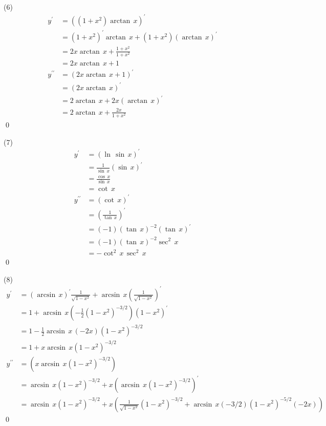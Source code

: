 (6) \solve
\begin{align}
    y^{\prime} &= \left(\left(1+x^2\right)\arctan \, x\right)^{\prime}\\
    &= \left(1+x^2\right)^\prime \arctan \, x + \left(1+x^2\right) \left(\arctan \, x\right)^\prime \\
    &= 2x \arctan \, x + \frac{1+x^2}{1+x^2} \\
    &= 2x \arctan \, x + 1 \\
    y^{\prime\prime} &= \left(2x\arctan \, x + 1\right)^\prime \\
    &= \left(2x\arctan \, x\right)^\prime \\
    &= 2 \arctan \, x + 2x \left(\arctan \, x\right)^{\prime} \\
    &= 2\arctan \, x + \frac{2x}{1+x^2}
\end{align}
\qed\bigskip

(7) \solve
\begin{align}
    y^{\prime} &= \left(\ln \, \sin \, x\right)^\prime \\
    &= \frac{1}{\sin \, x} \left(\sin \, x\right)^\prime \\
    &= \frac{\cos \, x}{\sin \, x} \\
    &= \cot \, x \\
    y^{\prime\prime} &= \left(\cot \, x\right)^\prime \\
    &= \left(\frac{1}{\tan \, x}\right)^\prime \\
    &= \left(-1\right)\left(\tan \, x\right)^{-2} \left(\tan \, x\right)^\prime \\
    &= \left(-1\right)\left(\tan \, x\right)^{-2}\sec^2 \, x \\
    &= - \cot^2 \, x \, \sec^2 \, x
\end{align}
\qed\bigskip

(8) \solve
\begin{align}
    y^\prime &= \left(\arcsin \, x\right)^\prime \frac{1}{\sqrt{1-x^2}} + \arcsin \, x \left(\frac{1}{\sqrt{1-x^2}}\right)^\prime \\
    &= 1 + \arcsin \, x \left(-\frac{1}{2}\left(1-x^2\right)^{-3/2}\right)\left(1-x^2\right)^\prime \\
    &= 1 -\frac{1}{2}\arcsin \, x \, \left(-2x\right) \left(1-x^2\right)^{-3/2} \\
    &= 1+x\arcsin \, x \left(1-x^2\right)^{-3/2} \\
    y^{\prime\prime} &= \left(x\arcsin \, x \left(1-x^2\right)^{-3/2}\right) \\
    &= \arcsin \, x \left(1-x^2\right)^{-3/2} + x \left(\arcsin \, x \left(1-x^2\right)^{-3/2}\right)^\prime \\
    &= \arcsin \, x \left(1-x^2\right)^{-3/2} + x \left(\frac{1}{\sqrt{1-x^2}}\left(1-x^2\right)^{-3/2}+\arcsin \, x \left(-3/2\right)\left(1-x^2\right)^{-5/2}\left(-2x\right)\right) 
\end{align}
\qed\bigskip


